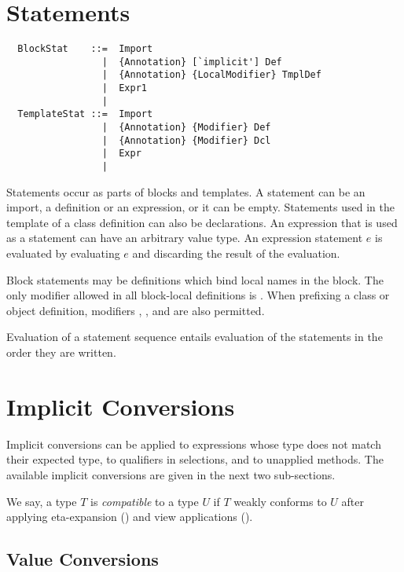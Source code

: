 \section{Statements}
\label{sec:statements}

\syntax\begin{lstlisting}
  BlockStat    ::=  Import
                 |  {Annotation} [`implicit'] Def
                 |  {Annotation} {LocalModifier} TmplDef
                 |  Expr1
                 | 
  TemplateStat ::=  Import
                 |  {Annotation} {Modifier} Def
                 |  {Annotation} {Modifier} Dcl
                 |  Expr
                 | 
\end{lstlisting}

Statements occur as parts of blocks and templates.  A statement can be
an import, a definition or an expression, or it can be empty.
Statements used in the template of a class definition can also be
declarations.  An expression that is used as a statement can have an
arbitrary value type. An expression statement $e$ is evaluated by
evaluating $e$ and discarding the result of the evaluation. 

Block statements may be definitions which bind local names in the
block. The only modifier allowed in all block-local definitions is
. When prefixing a class or object definition,
modifiers , , and  are also
permitted.

Evaluation of a statement sequence entails evaluation of the
statements in the order they are written.

\section{Implicit Conversions}
\label{sec:impl-conv}

Implicit conversions can be applied to expressions whose type does not
match their expected type, to qualifiers in selections, and to unapplied methods. The
available implicit conversions are given in the next two sub-sections.

We say, a type $T$ is {\em compatible} to a type $U$ if $T$ weakly conforms
to $U$ after applying eta-expansion () and view applications
().

\subsection{Value Conversions}

